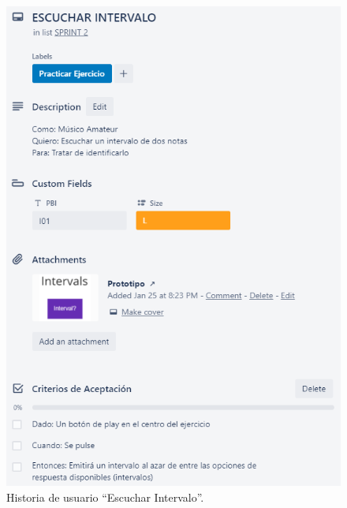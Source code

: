 \documentclass[12pt,twoside,titlepage]{report}
\begin{document}
{\begin{figure}[H]
    \centering
    \includegraphics[scale=1.3]{Scrum/User Stories/Intervalos}
    \caption{Historia de usuario ``Escuchar Intervalo''.}
    \label{fig:Intervalos}
\end{figure}

}
\end{document}
